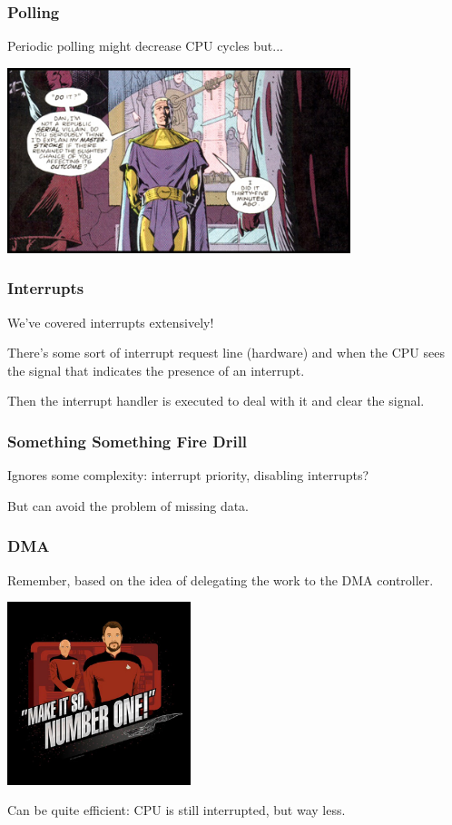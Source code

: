 \begin{frame}
\frametitle{Polling}

Periodic polling might decrease CPU cycles but...

\begin{center}
	\includegraphics[width=0.75\textwidth]{images/watchmen.jpg}
\end{center}


\end{frame}


\begin{frame}
\frametitle{Interrupts}

We've covered interrupts extensively!

There's some sort of interrupt request line (hardware) and when the CPU sees the signal that indicates the presence of an interrupt. 

Then the interrupt handler is executed to deal with it and clear the signal.

\end{frame}


\begin{frame}
\frametitle{Something Something Fire Drill}

Ignores some complexity: interrupt priority, disabling interrupts?

But can avoid the problem of missing data.

\end{frame}


\begin{frame}
\frametitle{DMA}

Remember, based on the idea of delegating the work to the DMA controller.

\begin{center}
	\includegraphics[width=0.4\textwidth]{images/makeitso.jpg}
\end{center}

Can be quite efficient: CPU is still interrupted, but way less.

\end{frame}





